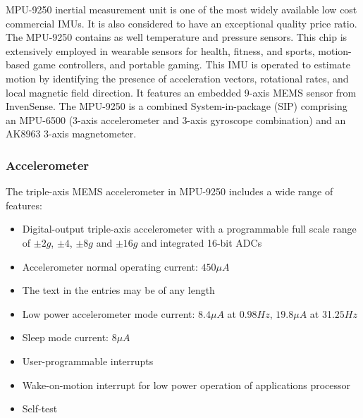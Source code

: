 MPU-9250 inertial measurement unit is one of the most widely available low cost commercial IMUs. It is also considered to have an exceptional quality price ratio. The MPU-9250 contains as well temperature and pressure sensors. This chip is extensively employed in wearable sensors for health, fitness, and sports, motion-based game controllers, and portable gaming. This IMU is operated to estimate motion by identifying the presence of acceleration vectors, rotational rates, and local magnetic field direction. It features an embedded 9-axis MEMS sensor from InvenSense. The MPU-9250 is a combined System-in-package (SIP) comprising an MPU-6500 (3-axis accelerometer and 3-axis gyroscope combination) and an AK8963 3-axis magnetometer.

\subsubsection{Accelerometer}

The triple-axis MEMS accelerometer in MPU-9250 includes a wide range of features:

\begin{itemize}
    \item Digital-output triple-axis accelerometer with a programmable full scale range  of $\pm 2g$, $\pm 4$, $\pm 8g$ and $\pm 16g$ and integrated 16-bit ADCs
    \item Accelerometer normal operating current: $450 \mu A$
    \item The text in the entries may be of any length
    \item Low power accelerometer mode current: $8.4 \mu A$ at $0.98Hz$, $19.8 \mu A$ at 31.$25Hz$
    \item Sleep mode current: $8 \mu A$
    \item User-programmable interrupts
    \item Wake-on-motion interrupt for low power operation of applications processor
    \item Self-test
\end{itemize}

